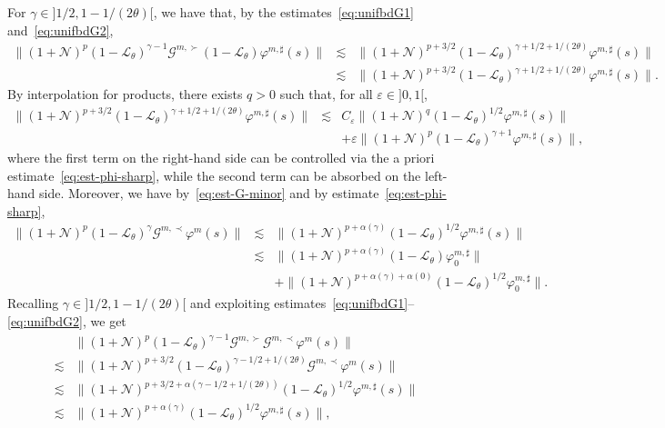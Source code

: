 \documentclass{article}
\begin{document}
For $\gamma \in] 1 / 2, 1 - 1 / (2 \theta) [$, we have that, by the
estimates~{\eqref{eq:unifbdG1}} and~{\eqref{eq:unifbdG2}},
\begin{eqnarray*}
  \| (1 +\mathcal{N})^p (1 -\mathcal{L}_{\theta})^{\gamma - 1} \mathcal{G}^{m,
  \succ} (1 -\mathcal{L}_{\theta}) \varphi^{m, \sharp} (s) \| & \lesssim & \|
  (1 +\mathcal{N})^{p + 3 / 2} (1 -\mathcal{L}_{\theta})^{\gamma + 1 / 2 + 1 /
  (2 \theta)} \varphi^{m, \sharp} (s) \|\\
  & \lesssim & \| (1 +\mathcal{N})^{p + 3 / 2} (1
  -\mathcal{L}_{\theta})^{\gamma + 1 / 2 + 1 / (2 \theta)} \varphi^{m, \sharp}
  (s) \| .
\end{eqnarray*}
By interpolation for products, there exists $q > 0$ such that, for all
$\varepsilon \in] 0, 1 [$,
\[ \begin{array}{lll}
     \| (1 +\mathcal{N})^{p + 3 / 2} (1 -\mathcal{L}_{\theta})^{\gamma + 1 / 2
     + 1 / (2 \theta)} \varphi^{m, \sharp} (s) \| & \lesssim & C_{\varepsilon}
     \| (1 +\mathcal{N})^q (1 -\mathcal{L}_{\theta})^{1 / 2} \varphi^{m,
     \sharp} (s) \|\\
     &  & + \varepsilon \| (1 +\mathcal{N})^p (1
     -\mathcal{L}_{\theta})^{\gamma + 1} \varphi^{m, \sharp} (s) \|,
   \end{array} \]
where the first term on the right-hand side can be controlled via the a priori
estimate~{\eqref{eq:est-phi-sharp}}, while the second term can be absorbed on
the left-hand side. Moreover, we have by~{\eqref{eq:est-G-minor}} and by
estimate~{\eqref{eq:est-phi-sharp}},
\[ \begin{array}{lll}
     \| (1 +\mathcal{N})^p (1 -\mathcal{L}_{\theta})^{\gamma} \mathcal{G}^{m,
     \prec} \varphi^m (s) \| & \lesssim & \| (1 +\mathcal{N})^{p + \alpha
     (\gamma)} (1 -\mathcal{L}_{\theta})^{1 / 2} \varphi^{m, \sharp} (s) \|\\
     & \lesssim & \| (1 +\mathcal{N})^{p + \alpha (\gamma)} (1
     -\mathcal{L}_{\theta}) \varphi^{m, \sharp}_0 \|\\
     &  & + \| (1 +\mathcal{N})^{p + \alpha (\gamma) + \alpha (0)} (1
     -\mathcal{L}_{\theta})^{1 / 2} \varphi^{m, \sharp}_0 \| .
   \end{array} \]
Recalling $\gamma \in] 1 / 2, 1 - 1 / (2 \theta) [$ and exploiting
estimates~{\eqref{eq:unifbdG1}}--{\eqref{eq:unifbdG2}}, we get
\[ \begin{array}{ll}
     & \| (1 +\mathcal{N})^p (1 -\mathcal{L}_{\theta})^{\gamma - 1}
     \mathcal{G}^{m, \succ} \mathcal{G}^{m, \prec} \varphi^m (s) \|\\
     \lesssim & \| (1 +\mathcal{N})^{p + 3 / 2} (1
     -\mathcal{L}_{\theta})^{\gamma - 1 / 2 + 1 / (2 \theta)} \mathcal{G}^{m,
     \prec} \varphi^m (s) \|\\
     \lesssim & \| (1 +\mathcal{N})^{p + 3 / 2 + \alpha (\gamma - 1 / 2 + 1 /
     (2 \theta))} (1 -\mathcal{L}_{\theta})^{1 / 2} \varphi^{m, \sharp} (s)
     \|\\
     \lesssim & \| (1 +\mathcal{N})^{p + \alpha (\gamma)} (1
     -\mathcal{L}_{\theta})^{1 / 2} \varphi^{m, \sharp} (s) \|,
   \end{array} \]
\end{document}
